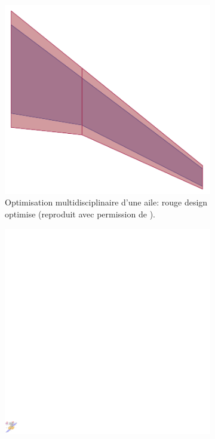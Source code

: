 \documentclass[12pt, french]{article}
\begin{document}
\begin{figure}[t]
	\begin{subfigure}[t]{0.3\textwidth}
		\includegraphics[width=\columnwidth]{MDo_wing.png}%
		\caption{Optimisation multidisciplinaire d'une aile: rouge design optimise (reproduit avec permission de \cite{masColomer2021mdo}). }
		\label{fig:wing}
	\end{subfigure}\hfill
	\begin{subfigure}[t]{0.3\textwidth}
		\includegraphics[width=\columnwidth]{Codesign_satellite.pdf} 

\end{subfigure}
\end{figure}
\end{document}

